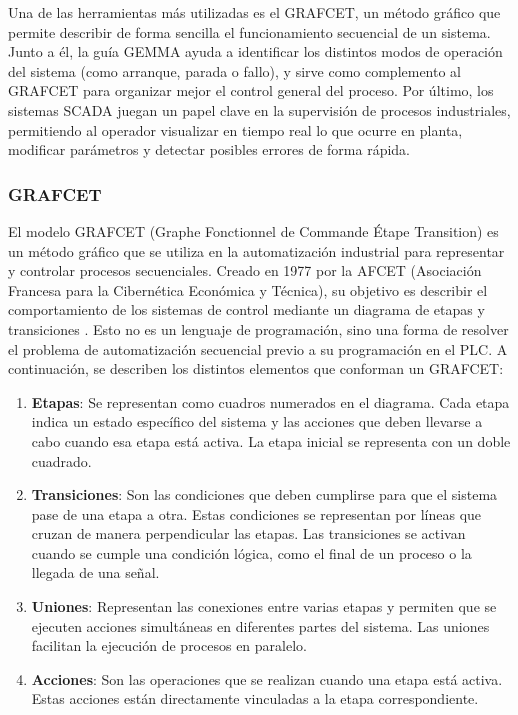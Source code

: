 Una de las herramientas más utilizadas es el GRAFCET, un método gráfico que permite describir de forma sencilla el funcionamiento secuencial de un sistema. Junto a él, la guía GEMMA ayuda a identificar los distintos modos de operación del sistema (como arranque, parada o fallo), y sirve como complemento al GRAFCET para organizar mejor el control general del proceso. Por último, los sistemas SCADA juegan un papel clave en la supervisión de procesos industriales, permitiendo al operador visualizar en tiempo real lo que ocurre en planta, modificar parámetros y detectar posibles errores de forma rápida.

\newpage

\subsubsection{GRAFCET}

El modelo GRAFCET (Graphe Fonctionnel de Commande Étape Transition) es un método gráfico que se utiliza en la automatización industrial para representar y controlar procesos secuenciales. Creado en 1977 por la AFCET (Asociación Francesa para la Cibernética Económica y Técnica), su objetivo es describir el comportamiento de los sistemas de control mediante un diagrama de etapas y transiciones \cite{grafcet_info}. Esto no es un lenguaje de programación, sino una forma de resolver el problema de automatización secuencial previo a su programación en el PLC. A continuación, se describen los distintos elementos que conforman un GRAFCET:

\begin{enumerate}
    \item \textbf{Etapas}: Se representan como cuadros numerados en el diagrama. Cada etapa indica un estado específico del sistema y las acciones que deben llevarse a cabo cuando esa etapa está activa. La etapa inicial se representa con un doble cuadrado.
    \item \textbf{Transiciones}: Son las condiciones que deben cumplirse para que el sistema pase de una etapa a otra. Estas condiciones se representan por líneas que cruzan de manera perpendicular las etapas. Las transiciones se activan cuando se cumple una condición lógica, como el final de un proceso o la llegada de una señal.
    \item \textbf{Uniones}: Representan las conexiones entre varias etapas y permiten que se ejecuten acciones simultáneas en diferentes partes del sistema. Las uniones facilitan la ejecución de procesos en paralelo.
    \item \textbf{Acciones}: Son las operaciones que se realizan cuando una etapa está activa. Estas acciones están directamente vinculadas a la etapa correspondiente.
\end{enumerate}
    
